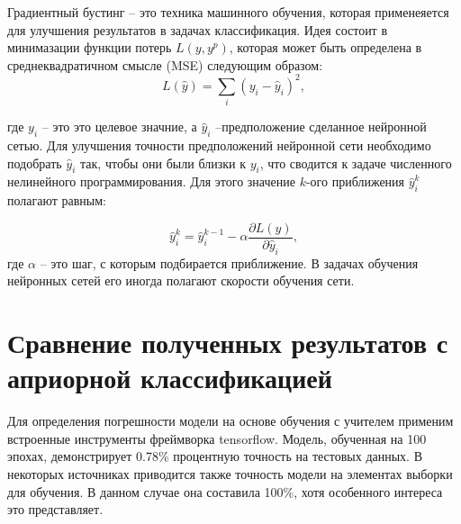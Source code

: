 Градиентный бустинг -- это техника машинного обучения, которая применеяется для улучшения результатов в задачах классификация. Идея состоит в минимазации функции потерь $L(y, y^p)$, которая может быть определена в среднеквадратичном смысле (MSE) следующим образом:
\begin{equation}
	L(\hat y) = \sum_{i} (y_i - \hat y _i)^2,
\end{equation} 

где $y_i$ -- это это целевое значние, а $\hat y_i$ --предположение сделанное нейронной сетью.
Для улучшения точности предположений нейронной сети необходимо подобрать $\hat y_i$ так, чтобы они были близки к $y_i$, что сводится к задаче численного нелинейного программирования.
Для этого значение $k$-ого приближения $\hat y_i^k$ полагают равным:

\begin{equation}
	\hat y_i^k =\hat y_i^{k-1} - \alpha \frac{\partial L(\hat y)}{\partial \hat y_i},
\end{equation}
где $\alpha$ -- это шаг, с которым подбирается приближение. В задачах обучения нейронных сетей его иногда полагают скорости обучения сети.


\chapter{Сравнение полученных результатов с априорной классификацией}

Для определения погрешности модели на основе обучения с учителем применим встроенные инструменты фреймворка tensorflow.
Модель, обученная на 100 эпохах, демонстрирует 0.78\% процентную точность на тестовых данных. В некоторых источниках приводится также точность модели на элементах выборки для обучения. В данном случае она составила 100\%, хотя особенного интереса это представляет.



